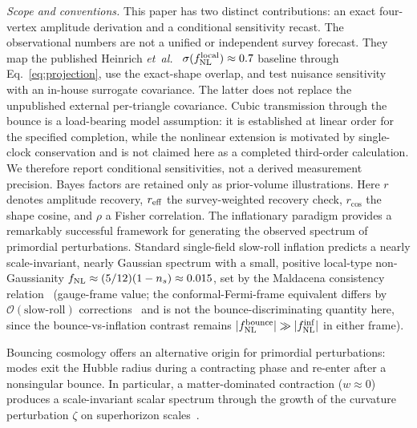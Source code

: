 \documentclass[aps,prd,twocolumn,superscriptaddress,showpacs,preprintnumbers,nofootinbib,longbibliography,floatfix]{revtex4-2}
\newcommand{\fnl}{f_{\rm NL}}
\newcommand{\etal}{\textit{et~al.}}
\begin{document}
\emph{Scope and conventions.} This paper has two distinct contributions: an exact four-vertex amplitude derivation and a conditional sensitivity recast. The observational numbers are not a unified or independent survey forecast. They map the published Heinrich \etal~\cite{Heinrich:2023} $\sigma(\fnl^{\rm local})\approx0.7$ baseline through Eq.~\eqref{eq:projection}, use the exact-shape overlap, and test nuisance sensitivity with an in-house surrogate covariance. The latter does not replace the unpublished external per-triangle covariance. Cubic transmission through the bounce is a load-bearing model assumption: it is established at linear order for the specified completion, while the nonlinear extension is motivated by single-clock conservation and is not claimed here as a completed third-order calculation. We therefore report conditional sensitivities, not a derived measurement precision. Bayes factors are retained only as prior-volume illustrations. Here $r$ denotes amplitude recovery, $r_{\rm eff}$ the survey-weighted recovery check, $r_{\cos}$ the shape cosine, and $\rho$ a Fisher correlation.
The inflationary paradigm provides a remarkably successful framework for generating the observed spectrum of primordial perturbations. Standard single-field slow-roll inflation predicts a nearly scale-invariant, nearly Gaussian spectrum with a small, positive local-type non-Gaussianity $\fnl \approx (5/12)(1-n_s) \approx 0.015$, set by the Maldacena consistency relation~\cite{Maldacena:2002vr} (gauge-frame value; the conformal-Fermi-frame equivalent differs by $\mathcal{O}(\text{slow-roll})$ corrections~\cite{Pajer:2013,TanakaUrakawa:2011} and is not the bounce-discriminating quantity here, since the bounce-vs-inflation contrast remains $|\fnl^{\rm bounce}| \gg |\fnl^{\rm inf}|$ in either frame).

Bouncing cosmology offers an alternative origin for primordial perturbations: modes exit the Hubble radius during a contracting phase and re-enter after a nonsingular bounce. In particular, a matter-dominated contraction ($w \approx 0$) produces a scale-invariant scalar spectrum through the growth of the curvature perturbation $\zeta$ on superhorizon scales~\cite{Wands:1998yp,Finelli:2001sr}.
\end{document}
